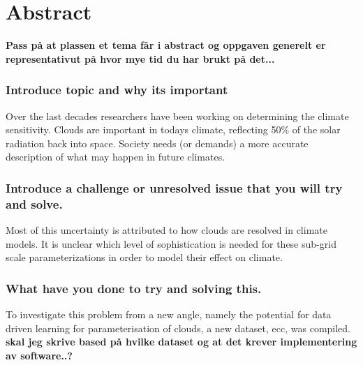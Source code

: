 \chapter*{Abstract}
\textbf{Pass på at plassen et tema får i abstract og oppgaven generelt er representativut på hvor mye tid du har brukt på det...}

\subsection*{Introduce topic and why its important}
Over the last decades researchers have been working on determining the climate sensitivity. %
 Clouds are important in todays climate, reflecting 50\% of the solar radiation back into space. Society needs (or demands) a more accurate description of what may happen in future climates.

\subsection*{Introduce a challenge or unresolved issue that you will try and solve.} Most of this uncertainty is attributed to how clouds are resolved in climate models.
It is unclear which level of sophistication is needed for these sub-grid scale parameterizations in order to model their effect on climate.

\subsection*{What have you done to try and solving this.}
To investigate this problem from a new angle,  namely the potential for data driven learning for parameterisation of clouds, a new dataset, \acrfull{ecc}, was compiled. \textbf{skal jeg skrive based på hvilke dataset og at det krever implementering av software..?}

